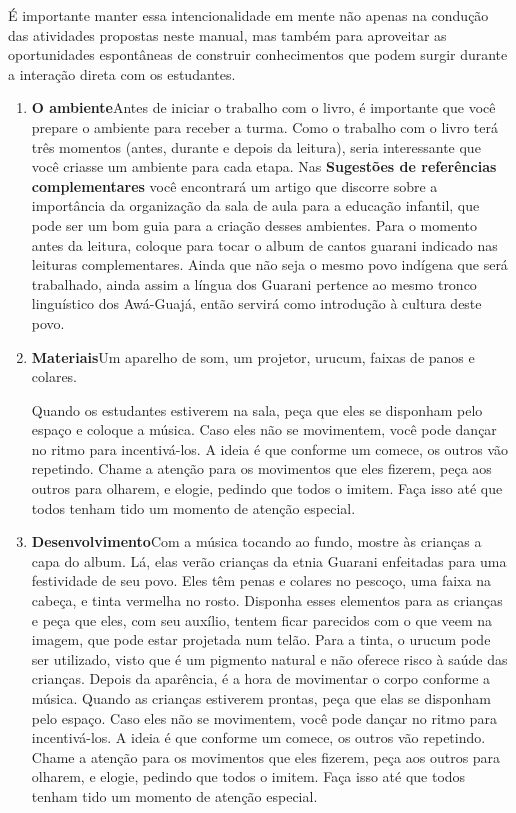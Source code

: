 \documentclass[11pt]{extarticle}
\begin{document}
É importante manter essa intencionalidade em mente não apenas na condução 
das atividades propostas neste manual, mas também para aproveitar as 
oportunidades espontâneas de construir conhecimentos que podem surgir durante 
a interação direta com os estudantes.

\begin{enumerate}
\item \textbf{O ambiente}\quad Antes de iniciar o trabalho com o livro, é importante que você 
prepare o ambiente para receber a turma. Como o trabalho com o livro terá 
três momentos (antes, durante e depois da leitura), seria interessante que você 
criasse um ambiente para cada etapa. Nas \textbf{Sugestões de referências complementares} 
você encontrará um artigo que discorre sobre a importância da organização da sala 
de aula para a educação infantil, que pode ser um bom guia para a criação desses 
ambientes. Para o momento antes da leitura, coloque para tocar o album de cantos 
guarani indicado nas leituras complementares. Ainda que não seja o mesmo povo
indígena que será trabalhado, ainda assim a língua dos Guarani pertence ao mesmo tronco
linguístico dos Awá-Guajá, então servirá como introdução à cultura deste povo.


\item \textbf{Materiais}\quad Um aparelho de som, um projetor, urucum, 
faixas de panos e colares. 

Quando os estudantes estiverem na sala,
peça que eles se disponham pelo espaço e coloque a música. Caso eles não 
se movimentem, você pode dançar no ritmo para incentivá-los. A ideia é que
conforme um comece, os outros vão repetindo. Chame a atenção para os movimentos
que eles fizerem, peça aos outros para olharem, e elogie, pedindo que todos
o imitem. Faça isso até que todos tenham tido um momento de atenção especial. 


\item \textbf{Desenvolvimento}\quad Com a música tocando ao fundo, mostre
às crianças a capa do album. Lá, elas verão crianças da etnia Guarani
enfeitadas para uma festividade de seu povo. Eles têm penas e colares no
pescoço, uma faixa na cabeça, e tinta vermelha no rosto. Disponha esses 
elementos para as crianças e peça que eles, com seu auxílio, tentem
ficar parecidos com o que veem na imagem, que pode estar projetada num telão. 
Para a tinta, o urucum pode ser utilizado, visto que é um pigmento natural
e não oferece risco à saúde das crianças.
Depois da aparência, é a hora de movimentar o corpo conforme a música.
Quando as crianças estiverem prontas, peça que elas se disponham pelo espaço. 
Caso eles não se movimentem, você pode dançar no ritmo para incentivá-los. A ideia é que
conforme um comece, os outros vão repetindo. Chame a atenção para os movimentos
que eles fizerem, peça aos outros para olharem, e elogie, pedindo que todos
o imitem. Faça isso até que todos tenham tido um momento de atenção especial. 


\end{enumerate}
\end{document}

